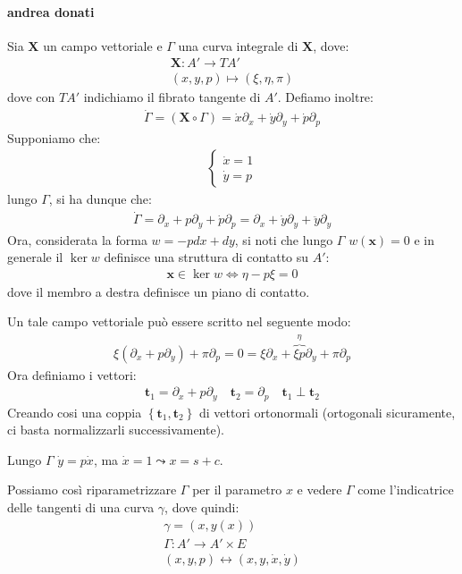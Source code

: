 \paragraph{andrea donati}
Sia $\bm{X}$ un campo vettoriale e $\Gamma$ una curva integrale di $\bm{X}$, dove:
\begin{align*}
    \bm{X}\colon A' \to TA'\\
    (x,y,p)\mapsto (\xi, \eta, \pi)
\end{align*}
dove con $TA'$ indichiamo il fibrato tangente di $A'$.
Defiamo inoltre:
\begin{align*}
    \dot{\Gamma}=(\bm{X}\circ \Gamma)=\dot{x}\partial_x+\dot{y}\partial_y+\dot{p}\partial_p
\end{align*}
Supponiamo che:
\begin{align*}
    \begin{cases*}
        \dot{x}=1\\
        \dot{y}=p
    \end{cases*}
\end{align*}
lungo $\Gamma$, si ha dunque che:
\begin{align*}
    \dot{\Gamma}=\partial_x+p\partial_y+\dot{p}\partial_p=\partial_x+\dot{y}\partial_y+\ddot{y}\partial_y
\end{align*}
Ora, considerata la forma $w=-pdx+dy$, si noti che lungo $\Gamma$ $w(\bm{x})=0$ e in generale il $\ker w$ definisce una struttura di contatto su $A'$:
\begin{align*}
    \bm{x}\in \ker w \iff \eta-p\xi=0
\end{align*}
dove il membro a destra definisce un piano di contatto.

Un tale campo vettoriale può essere scritto nel seguente modo:
\begin{align*}
    \xi (\partial_x +p\partial_y)+\pi\partial_p = 0 = \xi\partial_x+\overbrace{\xi p}^{\eta}\partial_y+\pi\partial_p
\end{align*}
Ora definiamo i vettori:
\begin{align*}
    \bm{t}_1=\partial_x+p\partial_y \quad \bm{t}_2=\partial_p \quad \bm{t}_1\perp\bm{t}_2
\end{align*}
Creando cosi una coppia $\left\{\bm{t}_1,\bm{t}_2\right\}$ di vettori ortonormali (ortogonali sicuramente, ci basta normalizzarli successivamente).

Lungo $\Gamma$ $\dot{y}=p\dot{x}$, ma $\dot{x}=1\leadsto x=s+c$.

Possiamo così riparametrizzare $\Gamma$ per il parametro $x$ e vedere $\Gamma$ come l'indicatrice delle tangenti di una curva $\gamma$, dove quindi:
\begin{align*}
    \gamma=(x,y(x)) \\
    \Gamma\colon A'\to A'\times E \\
     (x,y,p)\longleftrightarrow (x,y,\dot{x},\dot{y})
\end{align*}

